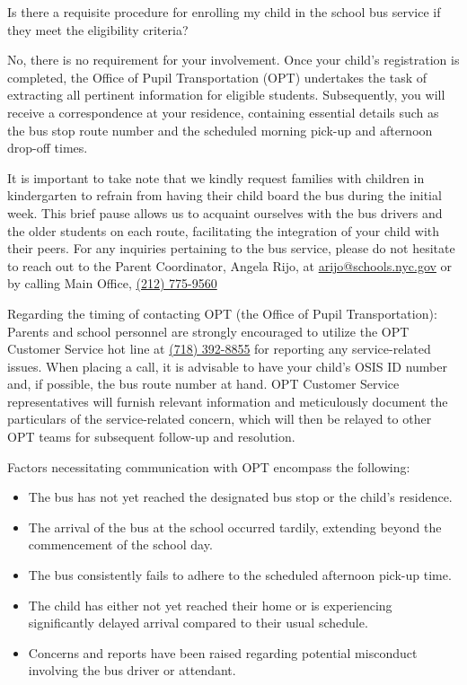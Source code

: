 \documentclass[11pt, letterpaper]{article}
\begin{document}
Is there a requisite procedure for enrolling my child in the school bus service if they meet the eligibility criteria?

No, there is no requirement for your involvement. Once your child's registration is completed, the Office of Pupil Transportation (OPT) undertakes the task of extracting all pertinent information for eligible students. Subsequently, you will receive a correspondence at your residence, containing essential details such as the bus stop route number and the scheduled morning pick-up and afternoon drop-off times.

It is important to take note that we kindly request families with children in kindergarten to refrain from having their child board the bus during the initial week. This brief pause allows us to acquaint ourselves with the bus drivers and the older students on each route, facilitating the integration of your child with their peers. For any inquiries pertaining to the bus service, please do not hesitate to reach out to the Parent Coordinator, Angela Rijo, at \href{arijo@schools.nyc.gov}{arijo@schools.nyc.gov} or by calling Main Office, \href{tel:2127759560}{(212) 775-9560}

Regarding the timing of contacting OPT (the Office of Pupil Transportation):
Parents and school personnel are strongly encouraged to utilize the OPT Customer Service hot line at \href{tel:7183928855}{(718) 392-8855} for reporting any service-related issues. When placing a call, it is advisable to have your child's OSIS ID number and, if possible, the bus route number at hand. OPT Customer Service representatives will furnish relevant information and meticulously document the particulars of the service-related concern, which will then be relayed to other OPT teams for subsequent follow-up and resolution.

Factors necessitating communication with OPT encompass the following:
\begin{itemize}
\item The bus has not yet reached the designated bus stop or the child's 
residence.
\item The arrival of the bus at the school occurred tardily, extending beyond the commencement of the school day.
\item The bus consistently fails to adhere to the scheduled afternoon pick-up time.
\item The child has either not yet reached their home or is experiencing significantly delayed arrival compared to their usual schedule.
\item Concerns and reports have been raised regarding potential misconduct involving the bus driver or attendant.
\end{itemize}
\newpage
\end{document}
